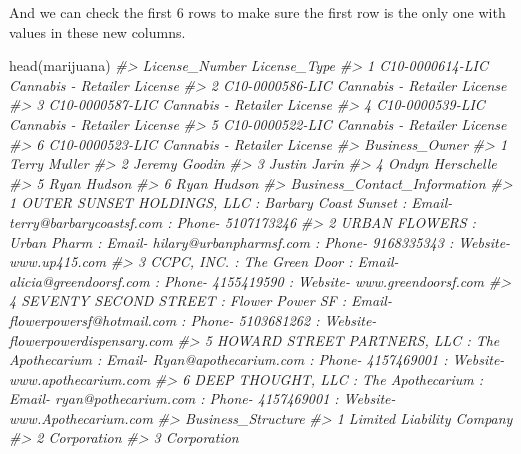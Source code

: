 \documentclass[
  12pt,
  openany]{book}
\newenvironment{Shaded}{\begin{snugshade}}{\end{snugshade}}
\newcommand{\CommentTok}[1]{\textcolor[rgb]{0.37,0.37,0.37}{\textit{#1}}}
\newcommand{\FunctionTok}[1]{\textcolor[rgb]{0,0,0}{#1}}
\newcommand{\NormalTok}[1]{#1}
\begin{document}
And we can check the first 6 rows to make sure the first row is the only one with values in these new columns.

\begin{Shaded}
\begin{Highlighting}[]
\FunctionTok{head}\NormalTok{(marijuana)}
\CommentTok{\#\textgreater{}    License\_Number                License\_Type}
\CommentTok{\#\textgreater{} 1 C10{-}0000614{-}LIC Cannabis {-} Retailer License}
\CommentTok{\#\textgreater{} 2 C10{-}0000586{-}LIC Cannabis {-} Retailer License}
\CommentTok{\#\textgreater{} 3 C10{-}0000587{-}LIC Cannabis {-} Retailer License}
\CommentTok{\#\textgreater{} 4 C10{-}0000539{-}LIC Cannabis {-} Retailer License}
\CommentTok{\#\textgreater{} 5 C10{-}0000522{-}LIC Cannabis {-} Retailer License}
\CommentTok{\#\textgreater{} 6 C10{-}0000523{-}LIC Cannabis {-} Retailer License}
\CommentTok{\#\textgreater{}     Business\_Owner}
\CommentTok{\#\textgreater{} 1     Terry Muller}
\CommentTok{\#\textgreater{} 2    Jeremy Goodin}
\CommentTok{\#\textgreater{} 3     Justin Jarin}
\CommentTok{\#\textgreater{} 4 Ondyn Herschelle}
\CommentTok{\#\textgreater{} 5      Ryan Hudson}
\CommentTok{\#\textgreater{} 6      Ryan Hudson}
\CommentTok{\#\textgreater{}                                                                                                           Business\_Contact\_Information}
\CommentTok{\#\textgreater{} 1                             OUTER SUNSET HOLDINGS, LLC  : Barbary Coast Sunset : Email{-} terry@barbarycoastsf.com : Phone{-} 5107173246}
\CommentTok{\#\textgreater{} 2                           URBAN FLOWERS  : Urban Pharm : Email{-} hilary@urbanpharmsf.com : Phone{-} 9168335343 : Website{-} www.up415.com}
\CommentTok{\#\textgreater{} 3                      CCPC, INC.  : The Green Door : Email{-} alicia@greendoorsf.com : Phone{-} 4155419590 : Website{-} www.greendoorsf.com}
\CommentTok{\#\textgreater{} 4 SEVENTY SECOND STREET  : Flower Power SF : Email{-} flowerpowersf@hotmail.com : Phone{-} 5103681262 : Website{-} flowerpowerdispensary.com}
\CommentTok{\#\textgreater{} 5   HOWARD STREET PARTNERS, LLC  : The Apothecarium : Email{-} Ryan@apothecarium.com : Phone{-} 4157469001 : Website{-} www.apothecarium.com}
\CommentTok{\#\textgreater{} 6              DEEP THOUGHT, LLC  : The Apothecarium : Email{-} ryan@pothecarium.com : Phone{-} 4157469001 : Website{-} www.Apothecarium.com}
\CommentTok{\#\textgreater{}          Business\_Structure}
\CommentTok{\#\textgreater{} 1 Limited Liability Company}
\CommentTok{\#\textgreater{} 2               Corporation}
\CommentTok{\#\textgreater{} 3               Corporation}

\end{Highlighting}
\end{Shaded}
\end{document}
